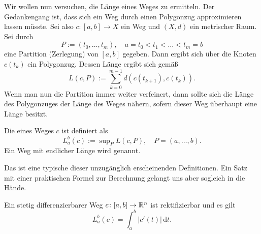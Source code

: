 Wir wollen nun versuchen, die Länge eines Weges zu ermitteln.
Der Gedankengang ist, dass sich ein Weg durch einen Polygonzug
approximieren lassen müsste. Sei also $c\colon [a,b]\to X$
ein Weg und $(X,d)$ ein metrischer Raum. Sei durch%
\begin{equation}
P:=(t_0,\ldots,t_m),\quad a=t_0<t_1<\ldots <t_m=b
\end{equation}
eine Partition (Zerlegung) von $[a,b]$ gegeben. Dann ergibt sich
über die Knoten $c(t_k)$ ein Polygonzug. Dessen Länge ergibt
sich gemäß%
\begin{equation}
L(c,P) := \sum_{k=0}^{m-1} d(c(t_{k+1}),c(t_k)).
\end{equation}
Wenn man nun die Partition immer weiter verfeinert, dann sollte
sich die Länge des Polygonzuges der Länge des Weges nähern, sofern
dieser Weg überhaupt eine Länge besitzt.
\begin{definition}
Die  eines Weges $c$ ist definiert als%
\begin{equation}
L_a^b(c) := \sup\nolimits_P L(c,P), \quad P=(a,\ldots,b).
\end{equation}
Ein Weg mit endlicher Länge wird  genannt.
\end{definition}
Das ist eine typische dieser unzugänglich erscheinenden Definitionen.
Ein Satz mit einer praktischen Formel zur Berechnung gelangt uns
aber sogleich in die Hände.
\begin{theorem}
Ein stetig differenzierbarer Weg $c\colon [a,b]\to\mathbb R^n$ ist
rektifizierbar und es gilt%
\begin{equation}\label{eq:Laenge}
L_a^b(c) = \int_a^b |c'(t)|\,\mathrm dt.
\end{equation}
\end{theorem}

